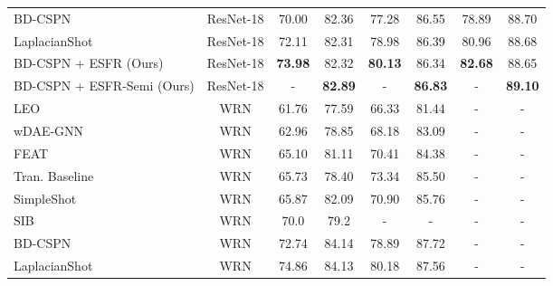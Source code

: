 \documentclass{article}
\begin{document}
\begin{table*}[t]
\begin{small}
\begin{center}
\begin{tabular}{lccccccc}
				BD-CSPN \cite{BDCSPN}                     & ResNet-18         & 70.00                & 82.36               & 77.28                 & 86.55                & 78.89           & 88.70               \\
				LaplacianShot \cite{LaplacianShot}        & ResNet-18         & 72.11                & 82.31               & 78.98                 & 86.39                & 80.96           & 88.68           \\
				\rowcolor[HTML]{EFEFEF} BD-CSPN + ESFR (Ours) & ResNet-18         & \textbf{73.98}       & 82.32      & \textbf{80.13}        & 86.34       & \textbf{82.68}  & 88.65  \\
				\rowcolor[HTML]{EFEFEF} BD-CSPN + ESFR-Semi (Ours) & ResNet-18         & -       & \textbf{82.89}      & -        & \textbf{86.83}       & -   & \textbf{89.10}  \\ \hline
LEO \cite{LEO}                            & WRN               & 61.76                & 77.59               & 66.33                 & 81.44                & -               & -               \\
				wDAE-GNN \cite{wDAE-GNN}                  & WRN               & 62.96                & 78.85               & 68.18                 & 83.09                & -               & -               \\
				FEAT \cite{FEAT}                          & WRN               & 65.10                & 81.11               & 70.41                 & 84.38                & -               & -               \\
				Tran. Baseline \cite{transBaseline}       & WRN               & 65.73                & 78.40               & 73.34                 & 85.50                & -               & -               \\
				SimpleShot \cite{SimpleShot}              & WRN               & 65.87                & 82.09               & 70.90                 & 85.76                & -               & -               \\
				SIB \cite{SIB}                            & WRN               & 70.0                 & 79.2                & -                     & -                    & -               & -               \\
				BD-CSPN \cite{BDCSPN}                     & WRN               & 72.74                & 84.14               & 78.89                 & 87.72                & -               & -               \\
				LaplacianShot \cite{LaplacianShot}        & WRN               & 74.86                & 84.13               & 80.18                 & 87.56                & -               & -               \\

\end{tabular}
\end{center}
\end{small}
\end{table*}
\end{document}
